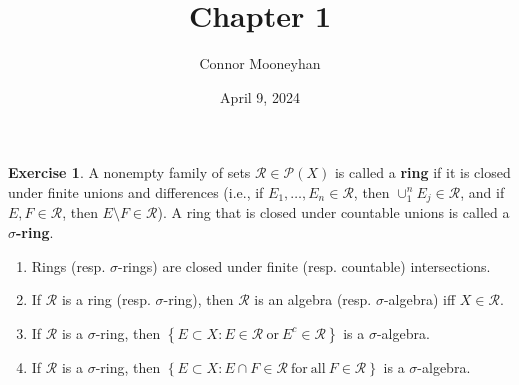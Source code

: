 \documentclass{article}
\title{Chapter 1}
\author{Connor Mooneyhan}
\date{April 9, 2024}
\theoremstyle{definition}
\newtheorem{ex}{Exercise}
\begin{document}
\maketitle

\begin{ex}
	A nonempty family of sets $\mathscr{R} \in \mathscr{P}(X)$ is called a \textbf{ring} if it is closed under finite unions and differences (i.e., if $E_1, \dots, E_n \in \mathscr{R}$, then $\cup _{1}^{n} E_j \in \mathscr{R}$, and if $E, F \in \mathscr{R}$, then $E \setminus F \in \mathscr{R}$).
	A ring that is closed under countable unions is called a \textbf{$\sigma$-ring}.
	\begin{enumerate}[label=\textbf{\alph*.}]
		\item Rings (resp. $\sigma$-rings) are closed under finite (resp. countable) intersections.
		\item If $\mathscr{R}$ is a ring (resp. $\sigma$-ring), then $\mathscr{R}$ is an algebra (resp. $\sigma$-algebra) iff $X \in \mathscr{R}$.
		\item If $\mathscr{R}$ is a $\sigma$-ring, then $\left\lbrace E \subset X : E \in \mathscr{R}\ \mathrm{or}\ E^c \in \mathscr{R} \right\rbrace$ is a $\sigma$-algebra.
		\item If $\mathscr{R}$ is a $\sigma$-ring, then $\left\lbrace E \subset X : E \cap F \in \mathscr{R} \ \mathrm{for\ all} \ F \in \mathscr{R} \right\rbrace$ is a $\sigma$-algebra.
	\end{enumerate}
\end{ex}
\end{document}

